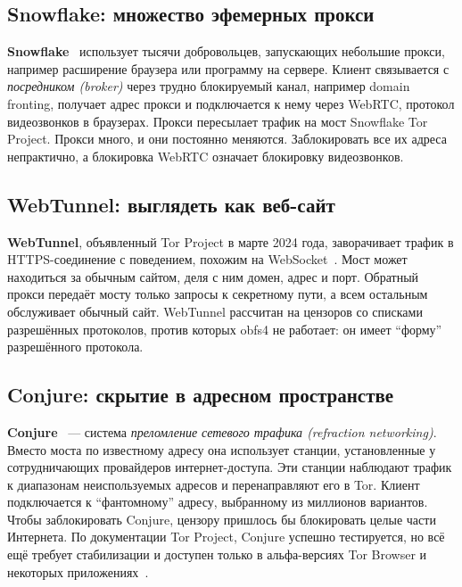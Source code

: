 \subsection{Snowflake: множество эфемерных прокси}

\textbf{Snowflake}~\cite{bocovich2024snowflake} использует тысячи добровольцев, запускающих небольшие прокси, например расширение браузера или программу на сервере. Клиент связывается с \emph{посредником (broker)} через трудно блокируемый канал, например domain fronting, получает адрес прокси и подключается к нему через WebRTC, протокол видеозвонков в браузерах. Прокси пересылает трафик на мост Snowflake Tor Project. Прокси много, и они постоянно меняются. Заблокировать все их адреса непрактично, а блокировка WebRTC означает блокировку видеозвонков.

\subsection{WebTunnel: выглядеть как веб-сайт}

\textbf{WebTunnel}, объявленный Tor Project в марте 2024 года, заворачивает трафик в HTTPS-соединение с поведением, похожим на WebSocket~\cite{torblogwebtunnel}. Мост может находиться за обычным сайтом, деля с ним домен, адрес и порт. Обратный прокси передаёт мосту только запросы к секретному пути, а всем остальным обслуживает обычный сайт. WebTunnel рассчитан на цензоров со списками разрешённых протоколов, против которых obfs4 не работает: он имеет \enquote{форму} разрешённого протокола.

\subsection{Conjure: скрытие в адресном пространстве}

\textbf{Conjure}~\cite{frolov2019conjure} --- система \emph{преломление сетевого трафика (refraction networking)}. Вместо моста по известному адресу она использует станции, установленные у сотрудничающих провайдеров интернет-доступа. Эти станции наблюдают трафик к диапазонам неиспользуемых адресов и перенаправляют его в Tor. Клиент подключается к \enquote{фантомному} адресу, выбранному из миллионов вариантов. Чтобы заблокировать Conjure, цензору пришлось бы блокировать целые части Интернета. По документации Tor Project, Conjure успешно тестируется, но всё ещё требует стабилизации и доступен только в альфа-версиях Tor Browser и некоторых приложениях~\cite{torsupport}.

